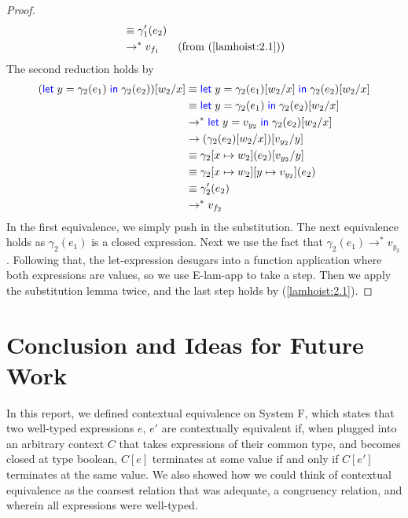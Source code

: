 \documentclass[twoside,11pt,openright]{report}
\theoremstyle{definition}
\newcommand{\var}{x}
\newcommand{\varB}{y}
\newcommand{\expr}{e}
\newcommand{\val}{v}
\newcommand{\valB}{w}
\newcommand{\subst}[3]{#1{\left[#3 \middle/ #2 \right]}}
\newcommand{\ctx}{C}
\newcommand{\step}{\rightarrow}
\newcommand{\stepS}{\rightarrow^*}
\newcommand{\map}[2]{#1 \mapsto #2}
\begin{document}
\begin{proof}
\begin{align*}
    &\equiv \gamma'_1(\expr_2)\\
    &\stepS \val_{f_1} &\text{(from (\ref{lamhoist:2.1}))}
  \end{align*}
  The second reduction holds by
  \begin{align*}
    \subst{(\Let \varB = \gamma_2(\expr_1) in \gamma_2(\expr_2))}{\var}{\valB_2}
    &\equiv
    \Let \varB = \subst{\gamma_2(\expr_1)}{\var}{\valB_2} in \subst{\gamma_2(\expr_2)}{\var}{\valB_2}\\
    &\equiv
    \Let \varB = \gamma_2(\expr_1) in \subst{\gamma_2(\expr_2)}{\var}{\valB_2}\\
    &\stepS
    \Let \varB = \val_{y_2} in \subst{\gamma_2(\expr_2)}{\var}{\valB_2}\\
    &\step
    \subst{(\subst{\gamma_2(\expr_2)}{\var}{\valB_2})}{\varB}{\val_{y_2}}\\
    &\equiv
    \subst{\gamma_2[\map{\var}{\valB_2}](\expr_2)}{\varB}{\val_{y_2}}\\
    &\equiv
    \gamma_2[\map{\var}{\valB_2}][\map{\varB}{\val_{y_2}}](\expr_2)\\
    &\equiv
    \gamma'_2(\expr_2)\\
    &\stepS \val_{f_2}
  \end{align*}
  In the first equivalence, we simply push in the substitution. The next equivalence holds as $\gamma_2(\expr_1)$ is a closed expression. Next we use the fact that $\gamma_2(\expr_1) \stepS \val_{y_2}$. Following that, the let-expression desugars into a function application where both expressions are values, so we use E-lam-app to take a step. Then we apply the substitution lemma twice, and the last step holds by (\ref{lamhoist:2.1}).
\end{proof}



\chapter{Conclusion and Ideas for Future Work}
\label{ch:conclusion}

In this report, we defined contextual equivalence on System F, which states that two well-typed expressions $\expr$, $\expr'$ are contextually equivalent if, when plugged into an arbitrary context $\ctx$ that takes expressions of their common type, and becomes closed at type boolean, $\ctx[\expr]$ terminates at some value if and only if $\ctx[\expr']$ terminates at the same value. We also showed how we could think of contextual equivalence as the coarsest relation that was adequate, a congruency relation, and wherein all expressions were well-typed.
\end{document}

